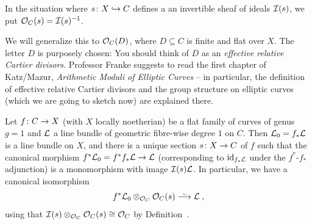 \documentclass[a4paper,parskip=half,numbers=enddot, DIV=12]{scrreprt}
\begin{document}
\begin{defi}
	In the situation where $s\colon X\monomorphism C$ defines a an invertible sheaf of ideals $\mathcal{I}(s)$, we put $\mathcal{O}_C(s)=\mathcal{I}(s)^{-1}$.
\end{defi}
\begin{rem}
	We will generalize this to $\mathcal{O}_C(D)$, where $D\subseteq C$ is finite and flat over $X$. The letter $D$ is purposely chosen: You should think of $D$ as an \emph{effective relative Cartier divisors}. Professor Franke suggests to read the first chapter of Katz/Mazur, \emph{Arithmetic Moduli of Elliptic Curves} \cite{katzmazur} -- in particular, the definition of effective relative Cartier divisors and the group structure on elliptic curves (which we are going to sketch now) are explained there.
\end{rem}
\begin{prop}
	Let $f\colon C\morphism X$ (with $X$ locally noetherian) be a flat family of curves of genus $g=1$ and $\mathcal{L}$ a line bundle of geometric fibre-wise degree $1$ on $C$. Then $\mathcal{L}_0=f_*\mathcal{L}$ is a line bundle on $X$, and there is a unique section $s\colon X\morphism C$ of $f$ such that the canonical morphism $f^*\Ll_0=f^*f_*\Ll\morphism\Ll$ (corresponding to $\operatorname{id}_{f_*\mathcal{L}}$ under the $f^*$-$f_*$ adjunction) is a monomorphism with image $\mathcal{I}(s)\mathcal{L}$. In particular, we have a canonical isomorphism
	\begin{align*}
		f^*\Ll_0\otimes_{\Oo_C}\Oo_C(s)\isomorphism\Ll\;,
	\end{align*}
	using that $\mathcal{I}(s)\otimes_{\mathcal{O}_C}\mathcal{O}_C(s)\cong \mathcal{O}_C$ by Definition~.
\end{prop}
\end{document}
